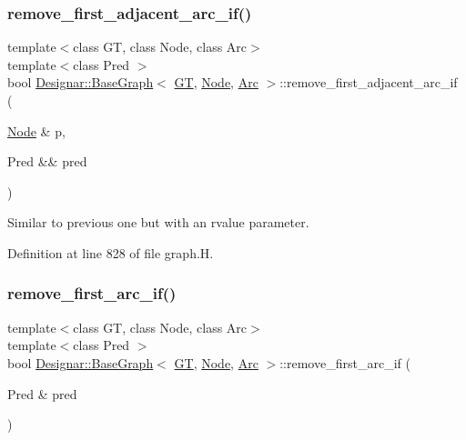 \subsubsection{\texorpdfstring{remove\+\_\+first\+\_\+adjacent\+\_\+arc\+\_\+if()}{remove\_first\_adjacent\_arc\_if()}\hspace{0.1cm}{\footnotesize\ttfamily [2/2]}}
{\footnotesize\ttfamily template$<$class GT, class Node, class Arc$>$ \\
template$<$class Pred $>$ \\
bool \hyperlink{class_designar_1_1_base_graph}{Designar\+::\+Base\+Graph}$<$ \hyperlink{demo-buildgraph_8_c_a3001c40d2c31ca87ed96cd7d1334a55e}{GT}, \hyperlink{namespace_designar_a5af326c65aa2bd26b26c410f2030d09e}{Node}, \hyperlink{namespace_designar_a3f55fb5513d62ff47cbc8f72b8e95d6f}{Arc} $>$\+::remove\+\_\+first\+\_\+adjacent\+\_\+arc\+\_\+if (\begin{DoxyParamCaption}\item[{\hyperlink{namespace_designar_a5af326c65aa2bd26b26c410f2030d09e}{Node} \&}]{p,  }\item[{Pred \&\&}]{pred }\end{DoxyParamCaption})\hspace{0.3cm}{\ttfamily [inline]}}



Similar to previous one but with an rvalue parameter. 



Definition at line 828 of file graph.\+H.

\mbox{\label{class_designar_1_1_base_graph_ae45255ef62c056e76c5e5c45182e9490}} 
\subsubsection{\texorpdfstring{remove\+\_\+first\+\_\+arc\+\_\+if()}{remove\_first\_arc\_if()}\hspace{0.1cm}{\footnotesize\ttfamily [1/2]}}
{\footnotesize\ttfamily template$<$class GT, class Node, class Arc$>$ \\
template$<$class Pred $>$ \\
bool \hyperlink{class_designar_1_1_base_graph}{Designar\+::\+Base\+Graph}$<$ \hyperlink{demo-buildgraph_8_c_a3001c40d2c31ca87ed96cd7d1334a55e}{GT}, \hyperlink{namespace_designar_a5af326c65aa2bd26b26c410f2030d09e}{Node}, \hyperlink{namespace_designar_a3f55fb5513d62ff47cbc8f72b8e95d6f}{Arc} $>$\+::remove\+\_\+first\+\_\+arc\+\_\+if (\begin{DoxyParamCaption}\item[{Pred \&}]{pred }\end{DoxyParamCaption})\hspace{0.3cm}{\ttfamily [inline]}}



